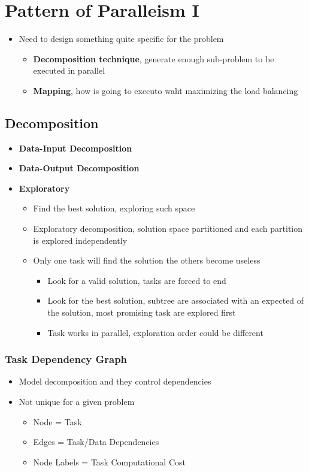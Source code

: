 \documentclass[12pt,oneside]{report}
\begin{document}
\chapter{Pattern of Paralleism I}
\begin{itemize}
    \item Need to design something quite specific for the problem
    \begin{itemize}
        \item \textbf{Decomposition technique}, generate enough sub-problem to be executed in parallel
        \item \textbf{Mapping}, how is going to executo waht maximizing the load balancing
    \end{itemize}
\end{itemize}

\section{Decomposition}
\begin{itemize}
    \item \textbf{Data-Input Decomposition}
    \item \textbf{Data-Output Decomposition}
    \item \textbf{Exploratory}
    \begin{itemize}
        \item Find the best solution, exploring such space
        \item Exploratory decomposition, solution space partitioned and each partition is explored independently
        \item Only one task will find the solution the others become useless
        \begin{itemize}
            \item Look for a valid solution, tasks are forced to end
            \item Look for the best solution, subtree are associated with an expected of the solution, most promising task are explored first
            \item Task works in parallel, exploration order could be different
        \end{itemize}
    \end{itemize}
\end{itemize}

\subsection{Task Dependency Graph}
\begin{itemize}
    \item Model decomposition and they control dependencies
    \item Not unique for a given problem
    \begin{itemize}
        \item Node = Task
        \item Edges = Task/Data Dependencies
        \item Node Labels = Task Computational Cost
    \end{itemize}
\end{itemize}
\end{document}
